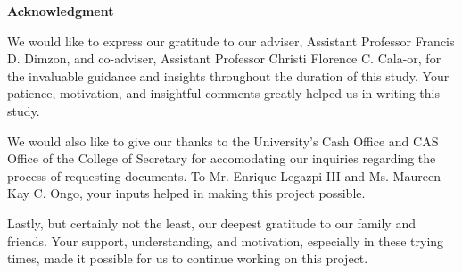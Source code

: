 \begin{center}
	\textbf{Acknowledgment}
\end{center}

We would like to express our gratitude to our adviser, Assistant Professor Francis D. Dimzon, and co-adviser, Assistant Professor Christi Florence C. Cala-or, for the invaluable guidance and insights throughout the duration of this study. Your patience, motivation, and insightful comments greatly helped us in writing this study.

We would also like to give our thanks to the University’s Cash Office and CAS Office of the College of Secretary for accomodating our inquiries regarding the process of requesting documents. To Mr. Enrique Legazpi III and Ms. Maureen Kay C. Ongo, your inputs helped in making this project possible.

Lastly, but certainly not the least, our deepest gratitude to our family and friends. Your support, understanding, and motivation, especially in these trying times, made it possible for us to continue working on this project.
